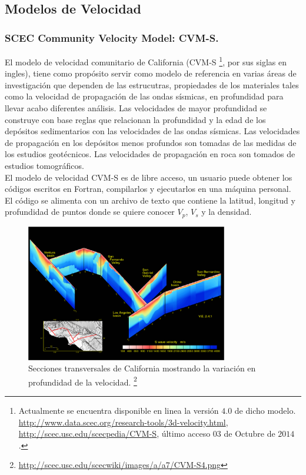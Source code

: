 \documentclass{beamer}
\begin{document}
\subsection{Modelos de Velocidad}
\begin{frame}[allowframebreaks]
\frametitle{SCEC Community Velocity Model: CVM-S.}
%
\justifying
%
El modelo de velocidad comunitario de California (CVM-S \footnote{Actualmente se encuentra disponible en linea la versión $4.0$ de dicho modelo. \url{http://www.data.scec.org/research-tools/3d-velocity.html}, \url{http://scec.usc.edu/scecpedia/CVM-S}, último acceso $03$ de Octubre de $2014$.}, por sus siglas en ingles), tiene como propósito servir como modelo de referencia en varias áreas de investigación que dependen de las estrucutras, propiedades de los materiales tales como la velocidad de propagación de las ondas sísmicas, en profundidad para llevar acabo diferentes análisis. Las velocidades de mayor profundidad se construye con base reglas que relacionan la profundidad y la edad de los depósitos sedimentarios con las velocidades de las ondas sísmicas. Las velocidades de propagación en los depósitos menos profundos son tomadas de las medidas de los estudios geotécnicos. Las velocidades de propagación en roca son tomados de estudios tomográficos.\\
%
El modelo de velocidad CVM-S es de libre acceso, un usuario puede obtener los códigos escritos en Fortran, compilarlos y ejecutarlos en una máquina personal. El código se alimenta con un archivo de texto que contiene la latitud, longitud y profundidad de puntos donde se quiere conocer $V_p$, $V_s$ y la densidad.
%
%
\begin{figure}[h]
	\centering
	\includegraphics[height=6cm]{img/CVM-S4.png}
	\caption{Secciones transversales de California mostrando la variación en profundidad de la velocidad. \footnote{\url{http://scec.usc.edu/scecwiki/images/a/a7/CVM-S4.png}}}
\end{figure}
%
\end{frame}
\end{document}
